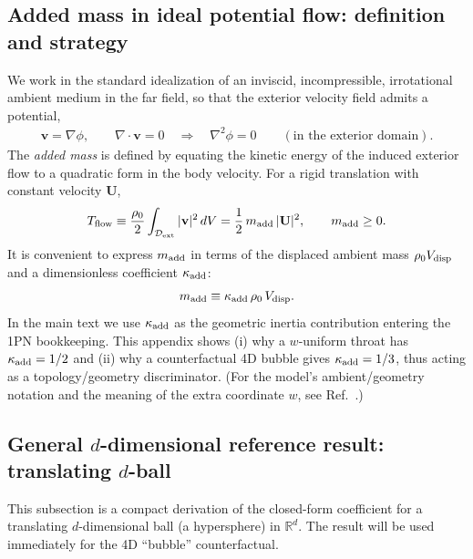\documentclass[11pt]{article}
\begin{document}
\subsection{Added mass in ideal potential flow: definition and strategy}
We work in the standard idealization of an inviscid, incompressible, irrotational
ambient medium in the far field, so that the exterior velocity field admits a
potential,
\begin{align}
\mathbf v = \nabla \phi,
\qquad
\nabla \cdot \mathbf v = 0
\quad\Longrightarrow\quad
\nabla^2 \phi = 0
\qquad
(\text{in the exterior domain}).
\end{align}
The \emph{added mass} is defined by equating the kinetic energy of the induced
exterior flow to a quadratic form in the body velocity.  For a rigid translation
with constant velocity $\mathbf U$,
\begin{align}
T_{\rm flow}
\equiv
\frac{\rho_0}{2}\int_{\mathcal D_{\rm ext}} |\mathbf v|^2\,dV
=
\frac{1}{2}\,m_{\rm add}\,|\mathbf U|^2,
\qquad
m_{\rm add}\ge 0.
\end{align}
It is convenient to express $m_{\rm add}$ in terms of the displaced ambient mass
$\rho_0 V_{\rm disp}$ and a dimensionless coefficient $\kappa_{\rm add}$:
\begin{align}
m_{\rm add} \equiv \kappa_{\rm add}\,\rho_0\,V_{\rm disp}.
\end{align}
In the main text we use $\kappa_{\rm add}$ as the geometric inertia contribution
entering the 1PN bookkeeping.  This appendix shows (i) why a $w$-uniform throat
has $\kappa_{\rm add}=1/2$ and (ii) why a counterfactual 4D bubble gives
$\kappa_{\rm add}=1/3$, thus acting as a topology/geometry discriminator.
(For the model's ambient/geometry notation and the meaning of the extra coordinate $w$,
see Ref.~\cite{norris2026_4d_model}.)

\subsection{General \texorpdfstring{$d$}{d}-dimensional reference result: translating \texorpdfstring{$d$}{d}-ball}
\label{app:added_mass:d_ball}
This subsection is a compact derivation of the closed-form coefficient for a
translating $d$-dimensional ball (a hypersphere) in $\mathbb R^d$.
The result will be used immediately for the 4D ``bubble'' counterfactual.
\end{document}
